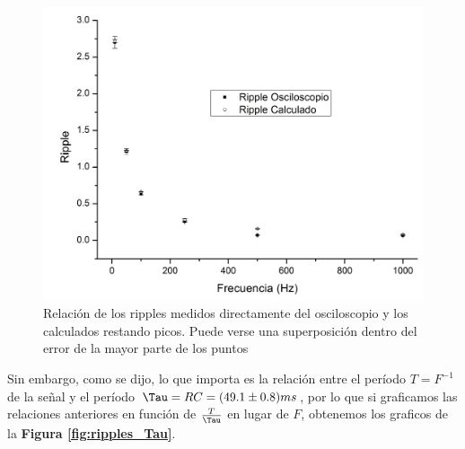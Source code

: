 \documentclass[11pt,a4paper]{article}
\begin{document}
\begin{figure}[H]
\centering
\includegraphics[scale=0.5]{ripples_media}
   \caption{Relación de los ripples medidos directamente del osciloscopio y los calculados restando picos. Puede verse una superposición dentro del error de la mayor parte de los puntos}
   \label{fig:ripples_media}
\end{figure}

Sin embargo, como se dijo, lo que importa es la relación entre el período $T = F^{-1}$ de la señal y el período $\Tau = RC = (49.1 \pm 0.8)ms$, por lo que si graficamos las relaciones anteriores en función de $\frac{T}{\Tau}$ en lugar de $F$, obtenemos los graficos de la \textbf{Figura \ref{fig:ripples_Tau}}.
\end{document}
